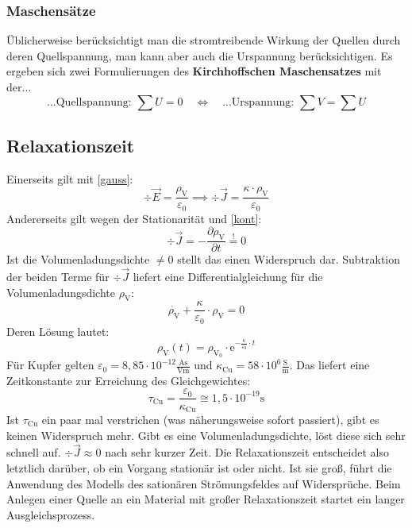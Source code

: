  \subsubsection{Maschensätze}
 Üblicherweise berücksichtigt man die stromtreibende Wirkung der Quellen durch deren Quellspannung, man kann aber auch die Urspannung berücksichtigen. Es ergeben sich zwei Formulierungen des \textbf{Kirchhoffschen Maschensatzes} mit der...
\begin{equation}\label{masche}
	\text{...Quellspannung: } \sum U = 0\quad\Leftrightarrow\quad \text{...Urspannung: } \sum V = \sum U 
\end{equation}


 \subsection{Relaxationszeit}\label{relax}
  Einerseits gilt mit \ref{gauss}: $$\div \vec{E} = \dfrac{\rho_\text{V}}{\varepsilon_0}\implies\div \vec{J} = \dfrac{\kappa \cdot \rho_\text{V}}{\varepsilon_0} $$
	   Andererseits gilt wegen der Stationarität und \ref{kont}: $$\div \vec{J} = -\dfrac{\partial \rho_\text{V}}{\partial t} \stackrel{!}{=} 0$$
	   Ist die Volumenladungsdichte $\neq 0$ stellt das einen Widerspruch dar. Subtraktion der beiden Terme für $\div \vec{J}$ liefert eine Differentialgleichung für die Volumenladungsdichte \(\rho_\text{V} \):
	        \begin{equation}
		        \dot{\rho_\text{V}} + \dfrac{\kappa}{\varepsilon_0} \cdot \rho_\text{V} = 0
	        \end{equation}
	   Deren Lösung lautet:
	        $$\rho_\text{V}(t) = \rho_\mathrm{V_0} \cdot \mathrm{e}^{-\frac{\kappa}{\varepsilon_0} \cdot t}$$
	   Für Kupfer gelten \(\varepsilon_0 = 8,85\cdot 10^{-12}\mathrm{  \frac{A s}{Vm}} \) und \(\kappa_\mathrm{Cu} = 58\cdot 10^6\mathrm{  \frac{S}{m}}\). Das liefert eine Zeitkonstante zur Erreichung des Gleichgewichtes:
	        \begin{equation}
		        \tau_\mathrm{Cu} = \dfrac{\varepsilon_0}{\kappa_\mathrm{Cu}} \cong 1,5\cdot 10^{-19}\mathrm{s}
	        \end{equation}
	        Ist $\tau_\text{Cu}$ ein paar mal verstrichen (was näherungsweise sofort passiert), gibt es keinen Widerspruch mehr. Gibt es eine Volumenladungsdichte, löst diese sich sehr schnell auf. $\div \vec{J}\approx 0$ nach sehr kurzer Zeit. Die Relaxationszeit entscheidet also letztlich darüber, ob ein Vorgang stationär ist oder nicht. Ist sie groß, führt die Anwendung des Modells des sationären Strömungsfeldes auf Widersprüche. Beim Anlegen einer Quelle an ein Material mit großer Relaxationszeit startet ein langer Ausgleichsprozess.

